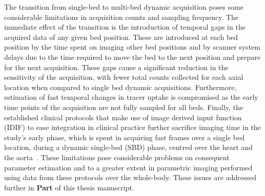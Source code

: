 The transition from single-bed to multi-bed dynamic acquisition poses some considerable limitations in acquisition counts and sampling frequency. The immediate effect of the transition is the introduction of temporal gaps in the acquired data of any given bed position. These are introduced at each bed position by the time spent on imaging other bed positions and by scanner system delays due to the time required to move the bed to the next position and prepare for the next acquisition. These gaps cause a significant reduction in the sensitivity of the acquisition, with fewer total counts collected for each axial location when compared to single bed dynamic acquisitions. Furthermore, estimation of fast temporal changes in tracer uptake is compromised as the early time points of the acquisition are not fully sampled for all beds. Finally, the established clinical protocols that make use of image derived input function (IDIF) to ease integration in clinical practice further sacrifice imaging time in the study’s early phase, which is spent in acquiring fast frames over a single bed location, during a dynamic single-bed (SBD) phase, centred over the heart and the aorta~\cite{Karakatsanis2013,Hu2020}.
These limitations pose considerable problems on consequent parameter estimation and to a greater extent in parametric imaging performed using data from these protocols over the whole-body. These issues are addressed further in \textbf{Part } of this thesis manuscript.
%
%

